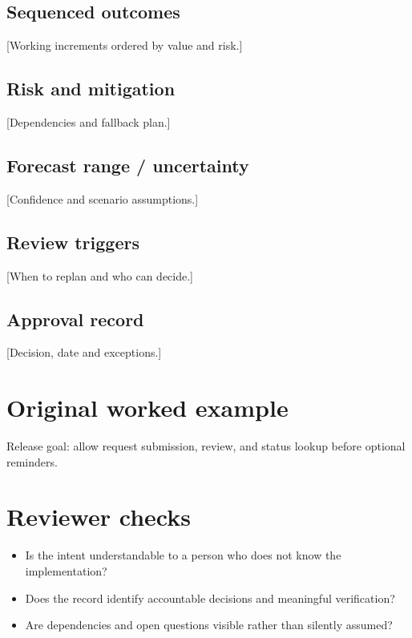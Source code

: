 \documentclass[11pt,letterpaper]{article}
\begin{document}
\subsection{Sequenced outcomes}
[Working increments ordered by value and risk.]

\subsection{Risk and mitigation}
[Dependencies and fallback plan.]

\subsection{Forecast range / uncertainty}
[Confidence and scenario assumptions.]

\subsection{Review triggers}
[When to replan and who can decide.]

\subsection{Approval record}
[Decision, date and exceptions.]

\section{Original worked example}
\begin{tcolorbox}[colback=tealback,colframe=navy,title={Illustrative entry},breakable]
Release goal: allow request submission, review, and status lookup before optional reminders.

\end{tcolorbox}
\section{Reviewer checks}
\begin{itemize}[leftmargin=*,itemsep=2pt]
\item Is the intent understandable to a person who does not know the implementation?
\item Does the record identify accountable decisions and meaningful verification?
\item Are dependencies and open questions visible rather than silently assumed?
\end{itemize}
\end{document}
